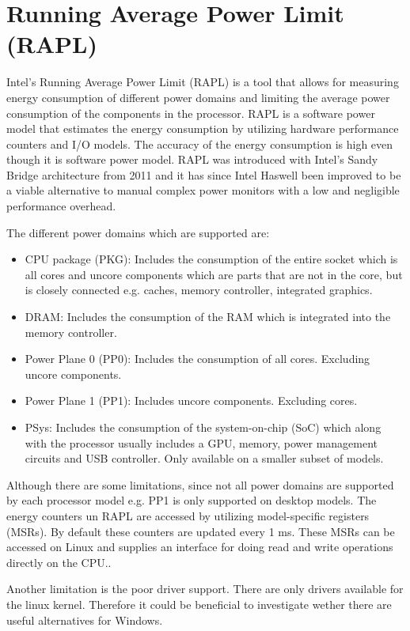 \section{Running Average Power Limit (RAPL)}
Intel's Running Average Power Limit (RAPL) is a tool that allows for measuring energy consumption of different power domains and limiting the average power consumption of the components in the processor. RAPL is a software power model that estimates the energy consumption by utilizing hardware performance counters and I/O models.\cite{Power-Management_Sandy_Bridge} The accuracy of the energy consumption is high even though it is software power model\cite{RAPL_ACU1,RAPL_ACU2}. RAPL was introduced with Intel’s Sandy Bridge architecture from 2011 and it has since Intel Haswell been improved to be a viable alternative to manual complex power monitors with a low and negligible performance overhead. \cite{RAPL_in_action}

The different power domains which are supported are:
\begin{itemize}
    \item CPU package (PKG): Includes the consumption of the entire socket which is all cores and uncore components which are parts that are not in the core, but is closely connected e.g. caches, memory controller, integrated graphics.
    \item DRAM: Includes the consumption of the RAM which is integrated into the memory controller.  
    \item Power Plane 0 (PP0): Includes the consumption of all cores. Excluding uncore components.
    \item Power Plane 1 (PP1): Includes uncore components. Excluding cores.
    \item PSys: Includes the consumption of the system-on-chip (SoC) which along with the processor usually includes a GPU, memory, power management circuits and USB controller. Only available on a smaller subset of models.
\end{itemize}
Although there are some limitations, since not all power domains are supported by each processor model e.g. PP1 is only supported on desktop models. The energy counters un RAPL are accessed by utilizing model-specific registers (MSRs). By default these counters are updated every 1 ms. These MSRs can be accessed on Linux and supplies an interface for doing read and write operations directly on the CPU.\cite{linux_manual_msr}. \nytafsnit

Another limitation is the poor driver support. There are only drivers available for the linux kernel. Therefore it could be beneficial to investigate wether there are useful alternatives for Windows.\cite{RAPL_in_action}  

